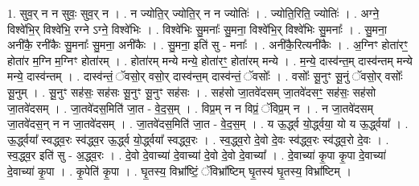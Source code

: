 \documentclass[17pt]{extarticle}
\begin{document}
1. सुव॒र् न न सुवः॒ सुव॒र् न । . न ज्योति॒र् ज्योति॒र् न न ज्योतिः॑ । . ज्योति॒रिति॒ ज्योतिः॑ । . अग्ने॒ विश्वे॑भि॒र् विश्वे॑भि॒ रग्ने ऽग्ने॒ विश्वे॑भिः । . विश्वे॑भिः सु॒मनाः᳚ सु॒मना॒ विश्वे॑भि॒र् विश्वे॑भिः सु॒मनाः᳚ । . सु॒मना॒ अनी॑कै॒ रनी॑कैः सु॒मनाः᳚ सु॒मना॒ अनी॑कैः । . सु॒मना॒ इति॑ सु - मनाः᳚ । . अनी॑कै॒रित्यनी॑कैः । . अ॒ग्निꣳ होता॑रꣳ॒॒ होता॑र म॒ग्नि म॒ग्निꣳ होता॑रम् । . होता॑रम् मन्ये मन्ये॒ होता॑रꣳ॒॒ होता॑रम् मन्ये । . म॒न्ये॒ दास्व॑न्त॒म् दास्व॑न्तम् मन्ये मन्ये॒ दास्व॑न्तम् । . दास्व॑न्तं॒ ॅवसो॒र् वसो॒र् दास्व॑न्त॒म् दास्व॑न्तं॒ ॅवसोः᳚ । . वसोः᳚ सू॒नुꣳ सू॒नुं ॅवसो॒र् वसोः᳚ सू॒नुम् । . सू॒नुꣳ सह॑सः॒ सह॑सः सू॒नुꣳ सू॒नुꣳ सह॑सः । . सह॑सो जा॒तवे॑दसम् जा॒तवे॑दसꣳ॒॒ सह॑सः॒ सह॑सो जा॒तवे॑दसम् । . जा॒तवे॑दस॒मिति॑ जा॒त - वे॒द॒स॒म् । . विप्र॒म् न न विप्रं॒ ॅविप्र॒म् न । . न जा॒तवे॑दसम् जा॒तवे॑दस॒न् न न जा॒तवे॑दसम् । . जा॒तवे॑दस॒मिति॑ जा॒त - वे॒द॒स॒म् । . य ऊ॒र्द्ध्व यो॒र्द्ध्वया॒ यो य ऊ॒र्द्ध्वया᳚ । . ऊ॒र्द्ध्वया᳚ स्वद्ध्व॒रः स्व॑द्ध्व॒र ऊ॒र्द्ध्व यो॒र्द्ध्वया᳚ स्वद्ध्व॒रः । . स्व॒द्ध्व॒रो दे॒वो दे॒वः स्व॑द्ध्व॒रः स्व॑द्ध्व॒रो दे॒वः । . स्व॒द्ध्व॒र इति॑ सु - अ॒द्ध्व॒रः । . दे॒वो दे॒वाच्या॑ दे॒वाच्या॑ दे॒वो दे॒वो दे॒वाच्या᳚ । . दे॒वाच्या॑ कृ॒पा कृ॒पा दे॒वाच्या॑ दे॒वाच्या॑ कृ॒पा । . कृ॒पेति॑ कृ॒पा । . घृ॒तस्य॒ विभ्रा᳚ष्टिं॒ ॅविभ्रा᳚ष्टिम् घृ॒तस्य॑ घृ॒तस्य॒ विभ्रा᳚ष्टिम् । \newline
\end{document}

